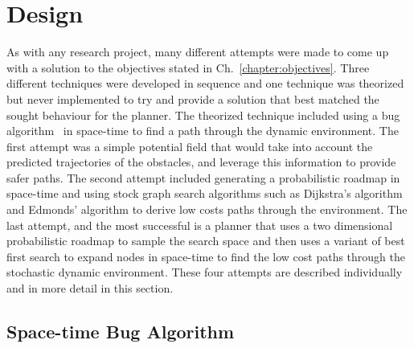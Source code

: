 


\chapter{Design}

\label{chapter:design}

As with any research project, many different attempts were made to come up with
a solution to the objectives stated in Ch.~\ref{chapter:objectives}. Three
different techniques were developed in sequence and one technique was theorized
but never implemented to try and provide a solution that best matched the
sought behaviour for the planner.  The theorized technique included using a bug
algorithm~\cite{weir} in space-time to find a path through the dynamic
environment.  The first attempt was a simple potential field that would take
into account the predicted trajectories of the obstacles, and leverage this
information to provide safer paths. The second attempt included generating a
probabilistic roadmap in space-time and using stock graph search algorithms
such as Dijkstra's algorithm and Edmonds' algorithm to derive low costs paths
through the environment. The last attempt, and the most successful is a planner
that uses a two dimensional probabilistic roadmap to sample the search space
and then uses a variant of best first search to expand nodes in space-time to
find the low cost paths through the stochastic dynamic environment.  These four
attempts are described individually and in more detail in this section.

\section{Space-time Bug Algorithm}

